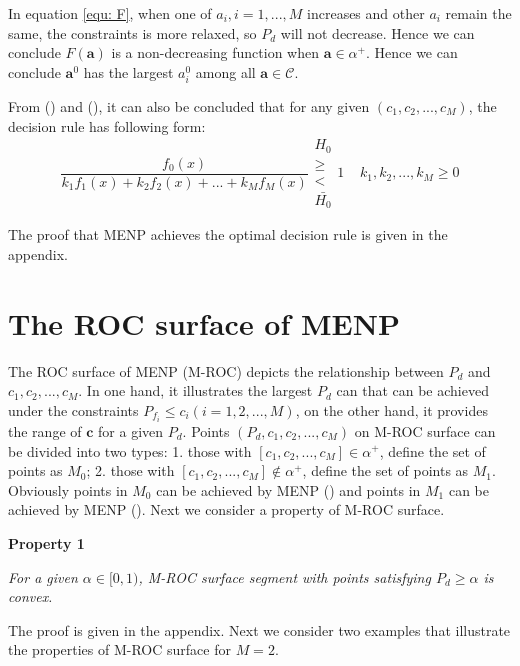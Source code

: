 \documentclass[12pt,journal,a4paper,twoside,onecolumn]{IEEEtran}
\newcommand{\rmnum}[1]{\romannumeral #1}
\begin{document}
\begin{spacing}{2.5}
In equation \eqref{equ: F}, when one of $a_i, i = 1, ..., M$ increases and other $a_i$ remain the same, the constraints is more relaxed, so $P_d$ will not decrease. Hence we can conclude $F(\mathbf{a})$ is a non-decreasing function when $\mathbf{a} \in \alpha^+$. Hence we can conclude $\mathbf{a}^0$ has the largest $a_i^0$ among all $\mathbf{a} \in \mathcal{C}$.

From (\rmnum{1}) and (\rmnum{2}), it can also be concluded that for any given $(c_1, c_2, ..., c_M)$, the decision rule has following form:
\begin{equation}
\frac{f_0(x)}{k_1f_1(x)+k_2f_2(x)+ ... + k_Mf_M(x)} \substack{H_0 \\ \geq \\ < \\ \bar{H_0}} 1\;\;\;\;k_1, k_2, ..., k_M \geq 0
\end{equation}

The proof that MENP achieves the optimal decision rule is given in the appendix.

\section{The ROC surface of MENP}

The ROC surface of MENP (M-ROC) depicts the relationship between $P_d$ and $c_1, c_2, ..., c_M$. In one hand, it  illustrates the largest $P_d$ can that can be achieved under the constraints $P_{f_i} \leq c_i (i = 1, 2, ..., M)$, on the other hand, it provides the range of $\mathbf{c}$ for a given $P_d$.
Points $(P_d, c_1, c_2, ..., c_M)$ on M-ROC  surface can be divided into two types: 1.  those with $[c_1, c_2, ..., c_M] \in \alpha^+$, define the set of points as $M_0$; 2. those with $[c_1, c_2, ..., c_M] \notin \alpha^+$, define the set of points as $M_1$. Obviously points in $M_0$ can be achieved by MENP (\rmnum{1}) and points in $M_1$ can  be achieved by MENP (\rmnum{2}). Next we consider a property of M-ROC surface.

\noindent\textbf{Property 1}

\noindent  \textit{
\noindent For a given $\alpha \in [0,1)$,  M-ROC surface segment with points satisfying $P_d \geq \alpha$ is  convex.
}

The proof is given in the appendix.
Next we consider two examples that illustrate the properties of M-ROC surface for $M = 2$.


\end{spacing}
\end{document}

